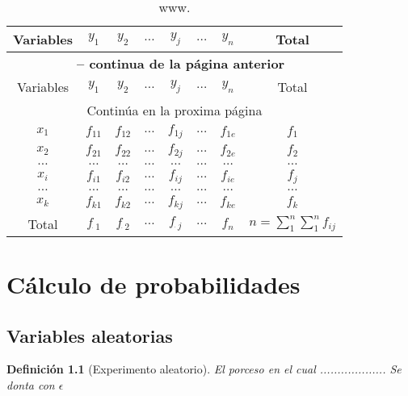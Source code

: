 \documentclass[a4paper]{report}
\newtheorem{defn}[thm]{Definición}
\begin{document}
\begin{longtable}{|c|cccccc|c|}
\caption{www.}
\label{tab:w}\\                                                    
\hline
Variables&$y_1$&$y_2$&$\ldots$&$y_{j}$&$\ldots$&$y_n$&Total\\
\hline
\endfirsthead
\multicolumn{8}{c}{{\bfseries \tablename\ \thetable{} -- continua de la página anterior}}\\
\hline
Variables&$y_1$&$y_2$&$\ldots$&$y_{j}$&$\ldots$&$y_n$&Total\\
\hline
\endhead
\hline
\multicolumn{8}{c}{{Continúa en la proxima página}} \\
\hline
\endfoot
\hline
\endlastfoot
$x_1$&$f_{11}$&$f_{12}$    &$\ldots$&$f_{1j}$&$\ldots$&$f_{1e}$&$f_1$\\
$x_2$&$f_{21}$&$f_{22}$    &$\ldots$&$f_{2j}$&$\ldots$&$f_{2e}$&$f_2$\\
$\ldots$&$\ldots$&$\ldots$ &$\ldots$&$\ldots$&$\ldots$&$\ldots$&$\ldots$\\
$x_i$&$f_{i1}$&$f_{i2}$    &$\ldots$&$f_{ij}$&$\ldots$&$f_{ie}$&$f_j$\\
$\ldots$&$\ldots$&$\ldots$ &$\ldots$&$\ldots$&$\ldots$&$\ldots$&$\ldots$\\
$x_k$&$f_{k1}$&$f_{k2}$    &$\ldots$&$f_{kj}$&$\ldots$&$f_{ke}$&$f_k$\\
\hline
Total&$f_{\dot \; 1}$&$f_{\dot \; 2}$   &$\ldots$&$f_{\dot \; j}$&$\ldots$&$f_n$  &$n=\sum_1^{n}\sum_1^{n}f_{ij}$\\
\end{longtable}




\part{Cálculo de probabilidades}
\chapter{Variables aleatorias}
\begin{defn}[Experimento aleatorio]
   El porceso en el cual ................... Se donta con $\epsilon$
\end{defn}
\end{document}
